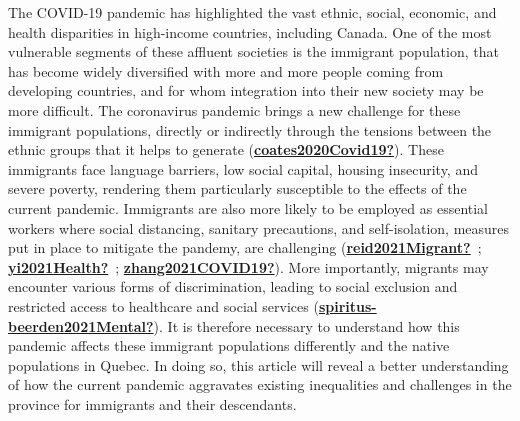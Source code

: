 \documentclass[
]{article}
\begin{document}
The COVID-19 pandemic has highlighted the vast ethnic, social, economic, and
health disparities in high-income countries, including Canada. One of the most
vulnerable segments of these affluent societies is the immigrant population,
that has become widely diversified with more and more people coming from
developing countries, and for whom integration into their new society may be
more difficult. The coronavirus pandemic brings a new challenge for these
immigrant populations, directly or indirectly through the tensions between the
ethnic groups that it helps to generate (\protect\hyperlink{ref-coates2020Covid19}{\textbf{coates2020Covid19?}}). These immigrants
face language barriers, low social capital, housing insecurity, and severe
poverty, rendering them particularly susceptible to the effects of the current
pandemic. Immigrants are also more likely to be employed as essential workers
where social distancing, sanitary precautions, and self-isolation, measures put
in place to mitigate the pandemy, are challenging (\protect\hyperlink{ref-reid2021Migrant}{\textbf{reid2021Migrant?}}~; \protect\hyperlink{ref-yi2021Health}{\textbf{yi2021Health?}}~; \protect\hyperlink{ref-zhang2021COVID19}{\textbf{zhang2021COVID19?}}). More importantly, migrants may encounter
various forms of discrimination, leading to social exclusion and restricted
access to healthcare and social services (\protect\hyperlink{ref-spiritus-beerden2021Mental}{\textbf{spiritus-beerden2021Mental?}}). It is
therefore necessary to understand how this pandemic affects these immigrant
populations differently and the native populations in Quebec. In doing so, this
article will reveal a better understanding of how the current pandemic
aggravates existing inequalities and challenges in the province for immigrants
and their descendants.
\end{document}
